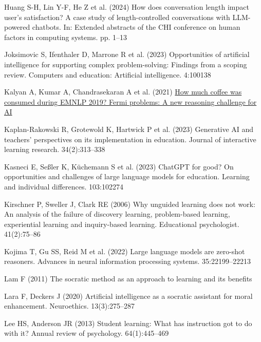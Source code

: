 \documentclass[
  12pt,
]{article}
\newlength{\cslhangindent}
\newenvironment{CSLReferences}[2] %
 {\begin{list}{}{%
  \setlength{\itemindent}{0pt}
  \setlength{\leftmargin}{0pt}
  \setlength{\parsep}{0pt}
  \ifodd #1
   \setlength{\leftmargin}{\cslhangindent}
   \setlength{\itemindent}{-1\cslhangindent}
  \fi
  \setlength{\itemsep}{#2\baselineskip}}}
 {\end{list}}
\begin{document}
\begin{CSLReferences}{1}{0}
Huang S-H, Lin Y-F, He Z et al. (2024) How does conversation length impact user's satisfaction? A case study of length-controlled conversations with LLM-powered chatbots. In: Extended abstracts of the CHI conference on human factors in computing systems. pp. 1--13

Joksimovic S, Ifenthaler D, Marrone R et al. (2023) Opportunities of artificial intelligence for supporting complex problem-solving: Findings from a scoping review. Computers and education: Artificial intelligence. 4:100138

Kalyan A, Kumar A, Chandrasekaran A et al. (2021) \href{https://arxiv.org/pdf/2110.14207.pdf}{How much coffee was consumed during EMNLP 2019? Fermi problems: A new reasoning challenge for AI}

Kaplan-Rakowski R, Grotewold K, Hartwick P et al. (2023) Generative AI and teachers' perspectives on its implementation in education. Journal of interactive learning research. 34(2):313--338

Kasneci E, Seßler K, Küchemann S et al. (2023) ChatGPT for good? On opportunities and challenges of large language models for education. Learning and individual differences. 103:102274

Kirschner P, Sweller J, Clark RE (2006) Why unguided learning does not work: An analysis of the failure of discovery learning, problem-based learning, experiential learning and inquiry-based learning. Educational psychologist. 41(2):75--86

Kojima T, Gu SS, Reid M et al. (2022) Large language models are zero-shot reasoners. Advances in neural information processing systems. 35:22199--22213

Lam F (2011) The socratic method as an approach to learning and its benefits

Lara F, Deckers J (2020) Artificial intelligence as a socratic assistant for moral enhancement. Neuroethics. 13(3):275--287

Lee HS, Anderson JR (2013) Student learning: What has instruction got to do with it? Annual review of psychology. 64(1):445--469


\end{CSLReferences}
\end{document}

